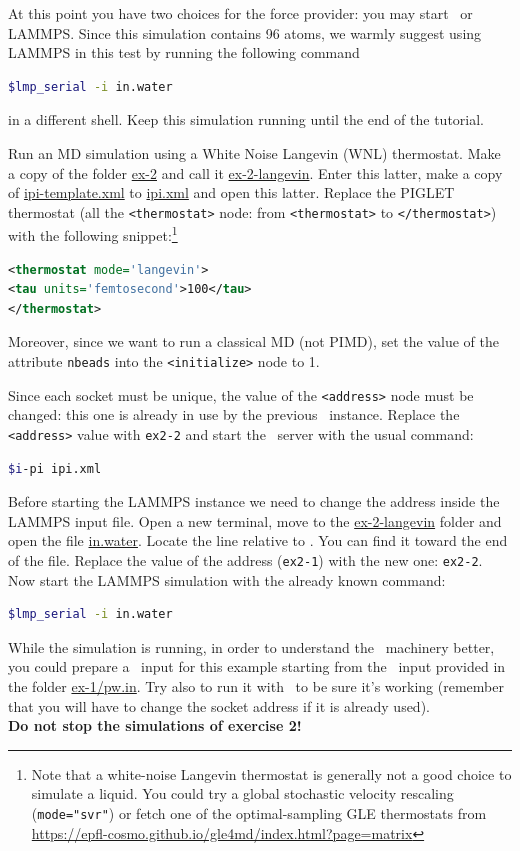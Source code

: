 \documentclass{article}
\begin{document}
\begin{Exercise}[label={inputs},title={Liquid water with the
    \emph{PIGLET} thermostat}]
At this point you have two choices for the force provider: you may start
\PWscf\ or LAMMPS. Since this simulation contains 96 atoms, we warmly
suggest using LAMMPS in this test by running the following command
\begin{lstlisting}[language=bash]
$lmp_serial -i in.water
\end{lstlisting}%
in a different shell. Keep this simulation running until the end of
the tutorial.

\Question
Run an MD simulation using a White Noise Langevin (WNL) thermostat.
Make a copy of the folder
\url{ex-2} and call it \url{ex-2-langevin}. Enter this latter, make a
copy of \url{ipi-template.xml} to \url{ipi.xml} and open this latter.
Replace the PIGLET thermostat (all the \texttt{<thermostat>} node:
from \texttt{<thermostat>} to \texttt{</thermostat>}) with the
following snippet:\footnote{Note that a white-noise Langevin 
thermostat is generally not a good choice to simulate a liquid. 
You could try a global stochastic velocity rescaling (\texttt{mode="svr"})
or fetch one of the optimal-sampling GLE thermostats
from 
\url{https://epfl-cosmo.github.io/gle4md/index.html?page=matrix}
}
\begin{lstlisting}[language=xml]
<thermostat mode='langevin'>
<tau units='femtosecond'>100</tau>
</thermostat>
\end{lstlisting}
Moreover, since we want to run a classical MD (not PIMD), set the
value of the attribute \texttt{nbeads} into the \texttt{<initialize>}
node to 1.

Since each socket must be unique, the value of the \texttt{<address>}
node must be changed: this one is already in use by the previous \ipi\
instance. Replace the \texttt{<address>} value with \texttt{ex2-2} and
start the \ipi\ server with the usual command:
\begin{lstlisting}[language=bash]
$i-pi ipi.xml
\end{lstlisting}%

Before starting the LAMMPS instance we need to change the address
inside the LAMMPS input file. Open a new terminal, move to the
\url{ex-2-langevin} folder and open the file \url{in.water}. Locate
the line relative to \ipi. You can find it toward the end of the
file. Replace the value of the address (\texttt{ex2-1}) with the new
one: \texttt{ex2-2}. Now start the LAMMPS simulation with the already
known command:
\begin{lstlisting}[language=bash]
$lmp_serial -i in.water
\end{lstlisting}%


While the simulation is running, in order to
understand the \ipi\ machinery better, you could prepare a \pwx\ input
for this example starting from the \pwx\ input provided in the folder
\url{ex-1/pw.in}. Try also to run it with \ipi\ to be sure it's
working (remember that you will have to change the socket address if
it is already used).\\
\vspace{2em}
\textbf{Do not stop the simulations of exercise 2!}

\end{Exercise}
\end{document}
